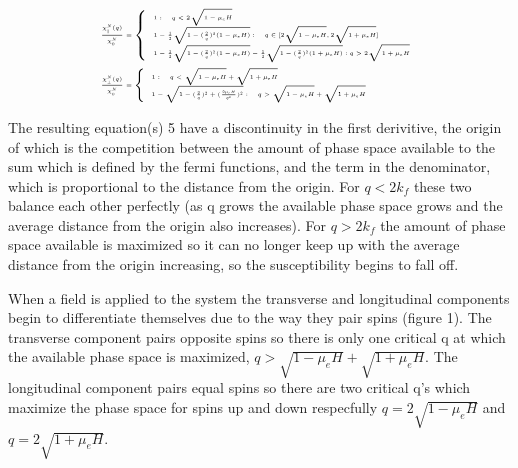 \documentclass[usletter,aps,prb,10pt,amssymb,amsmath,twocolumn]{revtex4-1}
\begin{document}
\begin{subequations}
{\fontsize{4}{6}\selectfont
\begin{align}
\frac{\chi^N_\parallel(q)}{\chi^N_0}& = \left\{
     \begin{array}{lr}
       1: \quad q < 2\sqrt{1-\mu_e H}\\
       1-\frac{1}{2}\sqrt{1-(\frac{2}{q})^2(1-\mu_e H)}: \quad q \in [2\sqrt{1-\mu_e H},2\sqrt{1+\mu_e H}] \\
       1-\frac{1}{2}\sqrt{1-(\frac{2}{q})^2(1-\mu_e H)}-\frac{1}{2}\sqrt{1-(\frac{2}{q})^2(1+\mu_e H)}:q > 2\sqrt{1+\mu_e H}
     \end{array}
   \right. \\
\frac{\chi^N_\perp(q)}{\chi^N_0} &= \left\{
     \begin{array}{lr}
       1 :\quad q < \sqrt{1-\mu_e H}+\sqrt{1+\mu_e H} \\
       1-\sqrt{1-(\frac{2}{q})^2+(\frac{2\mu_e H}{q^2})^2} : \quad q >\sqrt{1-\mu_e H}+\sqrt{1+\mu_e H}
     \end{array}
   \right.
\end{align}
}
\end{subequations}

The resulting equation(s) 5 have a discontinuity in the first derivitive, the origin of which is the competition between the amount of phase space available to the sum which is defined by the fermi functions, and the term in the denominator, which is proportional to the distance from the origin. For $q<2k_f$ these two balance each other perfectly (as q grows the available phase space grows and the average distance from the origin also increases). For $q>2k_f$ the amount of phase space available is maximized so it can no longer keep up with the average distance from the origin increasing, so the susceptibility begins to fall off. 

When a field is applied to the system the transverse and longitudinal components begin to differentiate themselves due to the way they pair spins (figure 1). The transverse component pairs opposite spins so there is only one critical q at which the available phase space is maximized, $q >\sqrt{1-\mu_e H}+\sqrt{1+\mu_e H}$. The longitudinal component pairs equal spins so there are two critical q's which maximize the phase space for spins up and down respecfully $q = 2\sqrt{1-\mu_e H}$ and $q = 2\sqrt{1+\mu_e H} $.
\end{document}
